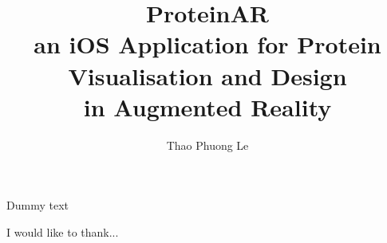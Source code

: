 \documentclass[MSCIM]{mscim}
\begin{document}

\title{\textbf{ProteinAR} \\an iOS Application for Protein Visualisation and Design \\in Augmented Reality}

\author{Thao Phuong Le}

\beforeabstract

Dummy text

\afterabstract


 I would like to thank...
 
 
\afterpreface







%
%




\printbibliography
\end{document}
